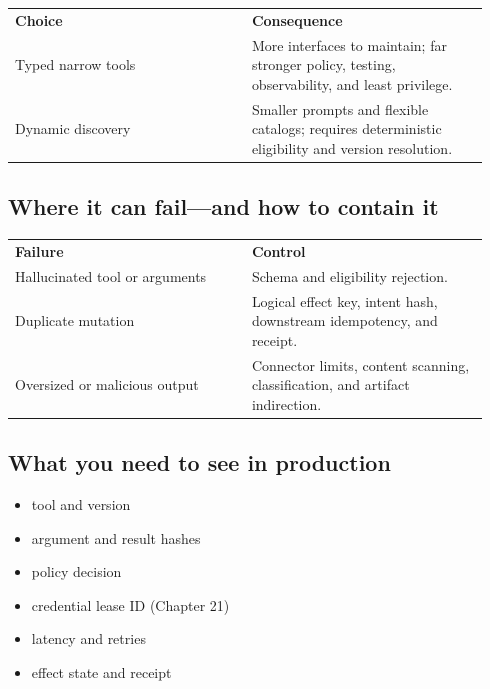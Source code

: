 \BookTableStart
\small
\begin{tabular}{@{}Y{0.4700\linewidth}Y{0.4700\linewidth}@{}}
\color{white}\bfseries \textbf{Choice} & \color{white}\bfseries \textbf{Consequence} \\
Typed narrow tools & More interfaces to maintain; far stronger policy, testing, observability, and least privilege. \\
Dynamic discovery & Smaller prompts and flexible catalogs; requires deterministic eligibility and version resolution. \\
\end{tabular}
\BookTableEnd

\subsection{Where it can fail—and how to contain it}

\BookTableStart
\small
\begin{tabular}{@{}Y{0.4700\linewidth}Y{0.4700\linewidth}@{}}
\color{white}\bfseries \textbf{Failure} & \color{white}\bfseries \textbf{Control} \\
Hallucinated tool or arguments & Schema and eligibility rejection. \\
Duplicate mutation & Logical effect key, intent hash, downstream idempotency, and receipt. \\
Oversized or malicious output & Connector limits, content scanning, classification, and artifact indirection. \\
\end{tabular}
\BookTableEnd

\subsection{What you need to see in production}

\begin{itemize}

\item tool and version

\item argument and result hashes

\item policy decision

\item credential lease ID (Chapter 21)

\item latency and retries

\item effect state and receipt

\end{itemize}

